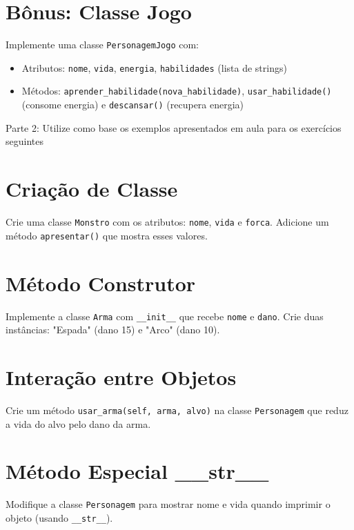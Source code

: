 \section{Bônus: Classe Jogo}
Implemente uma classe \texttt{PersonagemJogo} com:
\begin{itemize}
\item Atributos: \texttt{nome}, \texttt{vida}, \texttt{energia}, \texttt{habilidades} (lista de strings)
\item Métodos: \texttt{aprender\_habilidade(nova\_habilidade)}, \texttt{usar\_habilidade()} (consome energia) e \texttt{descansar()} (recupera energia)
\end{itemize}

\pagebreak

{\huge Parte 2: Utilize como base os exemplos apresentados em aula para os exercícios seguintes}


\section{Criação de Classe}
Crie uma classe \texttt{Monstro} com os atributos: \texttt{nome}, \texttt{vida} e \texttt{forca}. Adicione um método \texttt{apresentar()} que mostra esses valores.

\section{Método Construtor}
Implemente a classe \texttt{Arma} com \texttt{\_\_init\_\_} que recebe \texttt{nome} e \texttt{dano}. Crie duas instâncias: "Espada" (dano 15) e "Arco" (dano 10).


\section{Interação entre Objetos}
Crie um método \texttt{usar\_arma(self, arma, alvo)} na classe \texttt{Personagem} que reduz a vida do alvo pelo dano da arma.

\section{Método Especial \_\_str\_\_}
Modifique a classe \texttt{Personagem} para mostrar nome e vida quando imprimir o objeto (usando \texttt{\_\_str\_\_}).


